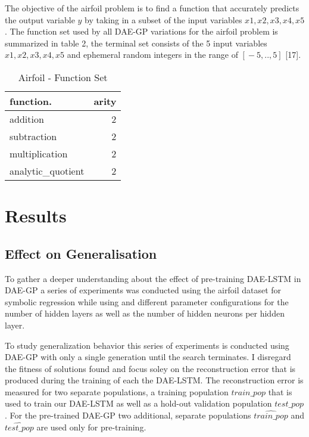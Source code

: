 \documentclass[
  11pt,
]{article}
\begin{document}
The objective of the airfoil problem is to find a function that
accurately predicts the output variable \(y\) by taking in a subset of
the input variables \(x1,x2,x3,x4,x5\). The function set used by all
DAE-GP variations for the airfoil problem is summarized in table 2, the
terminal set consists of the 5 input variables \(x1,x2,x3,x4,x5\) and
ephemeral random integers in the range of \([{}-5,..,5]\) {[}17{]}.

\begin{table}[!h]

\caption{\label{tab:airfoil_function_set}Airfoil - Function Set}
\centering
\begin{tabular}[t]{l|r}
\hline
\textbf{function.} & \textbf{arity}\\
\hline
addition & 2\\
\hline
subtraction & 2\\
\hline
multiplication & 2\\
\hline
analytic\_quotient & 2\\
\hline
\end{tabular}
\end{table}

\hypertarget{results}{%
\section{Results}\label{results}}

\hypertarget{effect-on-generalisation}{%
\subsection{Effect on Generalisation}\label{effect-on-generalisation}}

To gather a deeper understanding about the effect of pre-training
DAE-LSTM in DAE-GP a series of experiments was conducted using the
airfoil dataset for symbolic regression while using and different
parameter configurations for the number of hidden layers as well as the
number of hidden neurons per hidden layer.

To study generalization behavior this series of experiments is conducted
using DAE-GP with only a single generation until the search terminates.
I disregard the fitness of solutions found and focus soley on the
reconstruction error that is produced during the training of each the
DAE-LSTM. The reconstruction error is measured for two separate
populations, a training population \(train\_pop\) that is used to train
our DAE-LSTM as well as a hold-out validation population \(test\_pop\).
For the pre-trained DAE-GP two additional, separate populations
\(\hat{train\_pop}\) and \(\hat{test\_pop}\) are used only for
pre-training.
\end{document}
